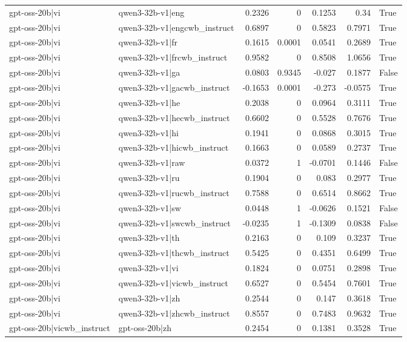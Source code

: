 \begin{table}
\begin{tabular}{l l r r r r l}
gpt-oss-20b|vi & qwen3-32b-v1|eng & 0.2326 & 0 & 0.1253 & 0.34 & True \\
gpt-oss-20b|vi & qwen3-32b-v1|engcwb_instruct & 0.6897 & 0 & 0.5823 & 0.7971 & True \\
gpt-oss-20b|vi & qwen3-32b-v1|fr & 0.1615 & 0.0001 & 0.0541 & 0.2689 & True \\
gpt-oss-20b|vi & qwen3-32b-v1|frcwb_instruct & 0.9582 & 0 & 0.8508 & 1.0656 & True \\
gpt-oss-20b|vi & qwen3-32b-v1|ga & 0.0803 & 0.9345 & -0.027 & 0.1877 & False \\
gpt-oss-20b|vi & qwen3-32b-v1|gacwb_instruct & -0.1653 & 0.0001 & -0.273 & -0.0575 & True \\
gpt-oss-20b|vi & qwen3-32b-v1|he & 0.2038 & 0 & 0.0964 & 0.3111 & True \\
gpt-oss-20b|vi & qwen3-32b-v1|hecwb_instruct & 0.6602 & 0 & 0.5528 & 0.7676 & True \\
gpt-oss-20b|vi & qwen3-32b-v1|hi & 0.1941 & 0 & 0.0868 & 0.3015 & True \\
gpt-oss-20b|vi & qwen3-32b-v1|hicwb_instruct & 0.1663 & 0 & 0.0589 & 0.2737 & True \\
gpt-oss-20b|vi & qwen3-32b-v1|raw & 0.0372 & 1 & -0.0701 & 0.1446 & False \\
gpt-oss-20b|vi & qwen3-32b-v1|ru & 0.1904 & 0 & 0.083 & 0.2977 & True \\
gpt-oss-20b|vi & qwen3-32b-v1|rucwb_instruct & 0.7588 & 0 & 0.6514 & 0.8662 & True \\
gpt-oss-20b|vi & qwen3-32b-v1|sw & 0.0448 & 1 & -0.0626 & 0.1521 & False \\
gpt-oss-20b|vi & qwen3-32b-v1|swcwb_instruct & -0.0235 & 1 & -0.1309 & 0.0838 & False \\
gpt-oss-20b|vi & qwen3-32b-v1|th & 0.2163 & 0 & 0.109 & 0.3237 & True \\
gpt-oss-20b|vi & qwen3-32b-v1|thcwb_instruct & 0.5425 & 0 & 0.4351 & 0.6499 & True \\
gpt-oss-20b|vi & qwen3-32b-v1|vi & 0.1824 & 0 & 0.0751 & 0.2898 & True \\
gpt-oss-20b|vi & qwen3-32b-v1|vicwb_instruct & 0.6527 & 0 & 0.5454 & 0.7601 & True \\
gpt-oss-20b|vi & qwen3-32b-v1|zh & 0.2544 & 0 & 0.147 & 0.3618 & True \\
gpt-oss-20b|vi & qwen3-32b-v1|zhcwb_instruct & 0.8557 & 0 & 0.7483 & 0.9632 & True \\
gpt-oss-20b|vicwb_instruct & gpt-oss-20b|zh & 0.2454 & 0 & 0.1381 & 0.3528 & True \\

\end{tabular}
\end{table}
